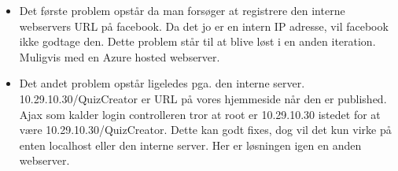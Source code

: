 \begin{itemize}
	\item Det første problem opstår da man forsøger at registrere den interne webservers URL på facebook. Da det jo er en intern IP adresse, vil facebook ikke godtage den. Dette problem står til at blive løst i en anden iteration. Muligvis med en Azure hosted webserver.
	\item Det andet problem opstår ligeledes pga. den interne server. 10.29.10.30/QuizCreator er URL på vores hjemmeside når den er published. Ajax som kalder login controlleren tror at root er 10.29.10.30 istedet for at være 10.29.10.30/QuizCreator. Dette kan godt fixes, dog vil det kun virke på enten localhost eller den interne server. Her er løsningen igen en anden webserver.
\end{itemize}